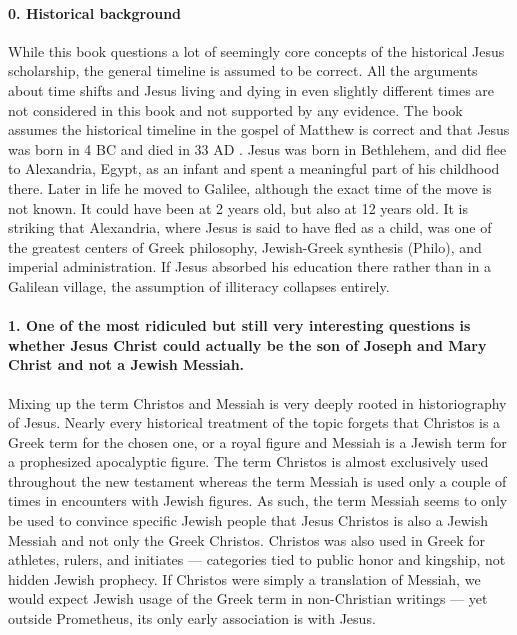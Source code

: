 \paragraph{0.
Historical background}\label{par:historical-background}

While this book questions a lot of seemingly core concepts of the historical Jesus scholarship, the general timeline is assumed to be correct.
All the arguments about time shifts and Jesus living and dying in even slightly different times are not considered in this book and not supported by any evidence.
The book assumes the historical timeline in the gospel of Matthew is correct and that Jesus was born in 4 BC and died in 33 AD .
Jesus was born in Bethlehem, and did flee to Alexandria, Egypt, as an infant and spent a meaningful part of his childhood there.
Later in life he moved to Galilee, although the exact time of the move is not known.
It could have been at 2 years old, but also at 12 years old.
It is striking that Alexandria, where Jesus is said to have fled as a child, was one of the greatest centers of Greek philosophy, Jewish-Greek synthesis (Philo), and imperial administration. If Jesus absorbed his education there rather than in a Galilean village, the assumption of illiteracy collapses entirely.

\paragraph{1.
One of the most ridiculed but still very interesting questions is whether Jesus Christ could actually be the son of Joseph and Mary Christ and not a Jewish Messiah.}\label{par:one-of-the-most-ridiculed-but-still-very-interesting-questions-is-whether-jesus-christ-could-actually-be-the-son-of-joseph-and-mary-christ-and-not-a-jewish-messiah.}

Mixing up the term Christos and Messiah is very deeply rooted in historiography of Jesus.
Nearly every historical treatment of the topic forgets that Christos is a Greek term for the chosen one, or a royal figure and Messiah is a Jewish term for a prophesized apocalyptic figure.
The term Christos is almost exclusively used throughout the new testament whereas the term Messiah is used only a couple of times in encounters with Jewish figures.
As such, the term Messiah seems to only be used to convince specific Jewish people that Jesus Christos is also a Jewish Messiah and not only the Greek Christos.
Christos was also used in Greek for athletes, rulers, and initiates — categories tied to public honor and kingship, not hidden Jewish prophecy. If Christos were simply a translation of Messiah, we would expect Jewish usage of the Greek term in non-Christian writings — yet outside Prometheus, its only early association is with Jesus.

